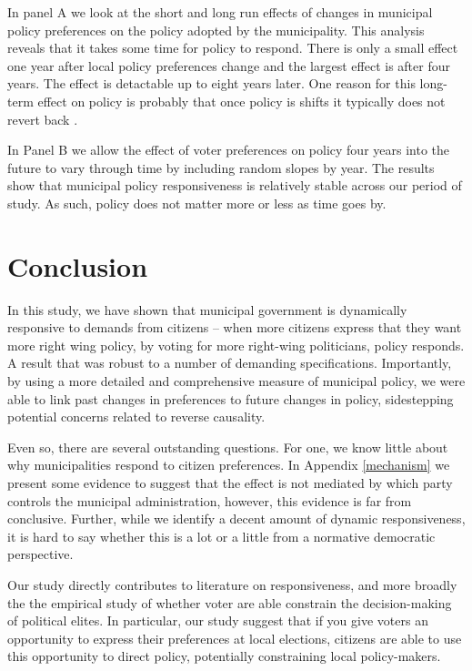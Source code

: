 \documentclass[a4paper,12pt]{article}
\begin{document}
In panel A we look at the short and long run effects of changes in municipal policy preferences on the policy adopted by the municipality. This analysis reveals that it takes some time for policy to respond. There is only a small effect one year after local policy preferences change and the largest effect is after four years. The effect is detactable up to eight years later. One reason for this long-term effect on policy is probably that once policy is shifts it typically does not revert back \citep[see, theories of punctuated equilibria, e.g.,][]{baumgartner2009punctuated}.

In Panel B we allow the effect of voter preferences on policy four years into the future to vary through time by including random slopes by year. The results show that municipal policy responsiveness is relatively stable across our period of study. As such, policy does not matter more or less as time goes by.





 






\section*{Conclusion}

In this study, we have shown that municipal government is dynamically responsive to demands from citizens -- when more citizens express that they want more right wing policy, by voting for more right-wing politicians, policy responds. A result that was robust to a number of demanding specifications. Importantly, by using a more detailed and comprehensive measure of municipal policy, we were able to link past changes in preferences to future changes in policy, sidestepping potential concerns related to reverse causality. 

Even so, there are several outstanding questions. For one, we know little about why municipalities respond to citizen preferences. In Appendix \ref{mechanism} we present some evidence to suggest that the effect is not mediated by which party controls the municipal administration, however, this evidence is far from conclusive. Further, while we identify a decent amount of dynamic responsiveness, it is hard to say whether this is a lot or a little from a normative democratic perspective.

Our study directly contributes to literature on responsiveness, and more broadly the the empirical study of whether voter are able constrain the decision-making of political elites. In particular, our study suggest that if you give voters an opportunity to express their preferences at local elections, citizens are able to use this opportunity to direct policy, potentially constraining local policy-makers.





\onehalfspacing



\clearpage

\renewcommand{\thesubsection}{\Alph{subsection}}
\renewcommand{\thetable}{\Alph{subsection}\arabic{table}}
\renewcommand{\thefigure}{\Alph{subsection}\arabic{figure}}
\end{document}
